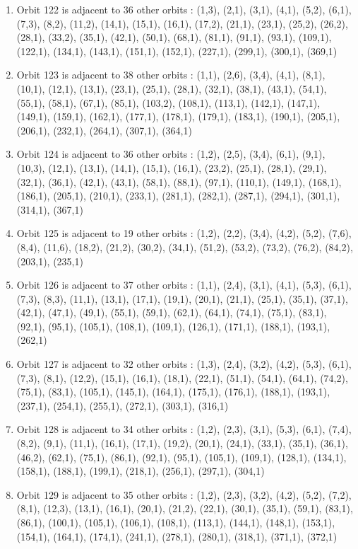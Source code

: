 \documentclass[12pt]{article}
\begin{document}
\begin{enumerate}
\item Orbit 122 is adjacent to 36 other orbits : (1,3), (2,1), (3,1), (4,1), (5,2), (6,1), (7,3), (8,2), (11,2), (14,1), (15,1), (16,1), (17,2), (21,1), (23,1), (25,2), (26,2), (28,1), (33,2), (35,1), (42,1), (50,1), (68,1), (81,1), (91,1), (93,1), (109,1), (122,1), (134,1), (143,1), (151,1), (152,1), (227,1), (299,1), (300,1), (369,1)
\item Orbit 123 is adjacent to 38 other orbits : (1,1), (2,6), (3,4), (4,1), (8,1), (10,1), (12,1), (13,1), (23,1), (25,1), (28,1), (32,1), (38,1), (43,1), (54,1), (55,1), (58,1), (67,1), (85,1), (103,2), (108,1), (113,1), (142,1), (147,1), (149,1), (159,1), (162,1), (177,1), (178,1), (179,1), (183,1), (190,1), (205,1), (206,1), (232,1), (264,1), (307,1), (364,1)
\item Orbit 124 is adjacent to 36 other orbits : (1,2), (2,5), (3,4), (6,1), (9,1), (10,3), (12,1), (13,1), (14,1), (15,1), (16,1), (23,2), (25,1), (28,1), (29,1), (32,1), (36,1), (42,1), (43,1), (58,1), (88,1), (97,1), (110,1), (149,1), (168,1), (186,1), (205,1), (210,1), (233,1), (281,1), (282,1), (287,1), (294,1), (301,1), (314,1), (367,1)
\item Orbit 125 is adjacent to 19 other orbits : (1,2), (2,2), (3,4), (4,2), (5,2), (7,6), (8,4), (11,6), (18,2), (21,2), (30,2), (34,1), (51,2), (53,2), (73,2), (76,2), (84,2), (203,1), (235,1)
\item Orbit 126 is adjacent to 37 other orbits : (1,1), (2,4), (3,1), (4,1), (5,3), (6,1), (7,3), (8,3), (11,1), (13,1), (17,1), (19,1), (20,1), (21,1), (25,1), (35,1), (37,1), (42,1), (47,1), (49,1), (55,1), (59,1), (62,1), (64,1), (74,1), (75,1), (83,1), (92,1), (95,1), (105,1), (108,1), (109,1), (126,1), (171,1), (188,1), (193,1), (262,1)
\item Orbit 127 is adjacent to 32 other orbits : (1,3), (2,4), (3,2), (4,2), (5,3), (6,1), (7,3), (8,1), (12,2), (15,1), (16,1), (18,1), (22,1), (51,1), (54,1), (64,1), (74,2), (75,1), (83,1), (105,1), (145,1), (164,1), (175,1), (176,1), (188,1), (193,1), (237,1), (254,1), (255,1), (272,1), (303,1), (316,1)
\item Orbit 128 is adjacent to 34 other orbits : (1,2), (2,3), (3,1), (5,3), (6,1), (7,4), (8,2), (9,1), (11,1), (16,1), (17,1), (19,2), (20,1), (24,1), (33,1), (35,1), (36,1), (46,2), (62,1), (75,1), (86,1), (92,1), (95,1), (105,1), (109,1), (128,1), (134,1), (158,1), (188,1), (199,1), (218,1), (256,1), (297,1), (304,1)
\item Orbit 129 is adjacent to 35 other orbits : (1,2), (2,3), (3,2), (4,2), (5,2), (7,2), (8,1), (12,3), (13,1), (16,1), (20,1), (21,2), (22,1), (30,1), (35,1), (59,1), (83,1), (86,1), (100,1), (105,1), (106,1), (108,1), (113,1), (144,1), (148,1), (153,1), (154,1), (164,1), (174,1), (241,1), (278,1), (280,1), (318,1), (371,1), (372,1)

\end{enumerate}
\end{document}
